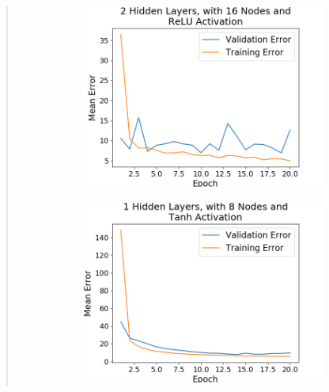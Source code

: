 \documentclass{article}
\begin{document}
\begin{quote}
\begin{figure}[h]
\begin{subfigure}[h]{0.23\textwidth}
		\includegraphics[width=\textwidth]{figs/Boston_Housing_Regression_2_Hidden_Layers_with_16_Nodes_and_ReLU_Activation.png}
	\end{subfigure}
\end{figure}	
	 \begin{figure}[h!]
	\centering
	\begin{subfigure}[h]{0.23\textwidth}
		\includegraphics[width=\textwidth]{figs/Boston_Housing_Regression_1_Hidden_Layers_with_8_Nodes_and_Tanh_Activation.png}
	\end{subfigure}
	\begin{subfigure}[h]{0.23\textwidth}

\end{subfigure}
\end{figure}
\end{quote}
\end{document}
